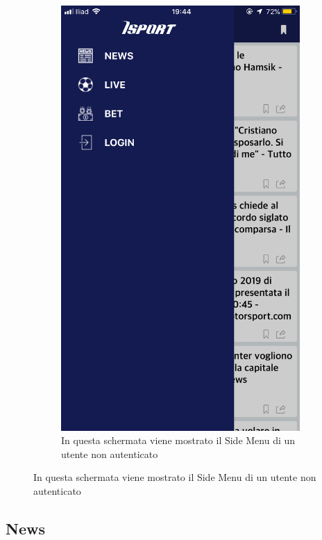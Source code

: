 \documentclass[numbers=noenddot, 12pt, a4paper, oneside]{scrbook}
\begin{document}
\begin{figure}[H]
\begin{subfigure}{.5\textwidth}
		\includegraphics[width=.8\linewidth]{images/Screen/SideLogout}
		\caption{In questa schermata viene mostrato il Side Menu di un utente non autenticato}
	\end{subfigure}
\end{figure}


\subsection*{News}
\end{document}
